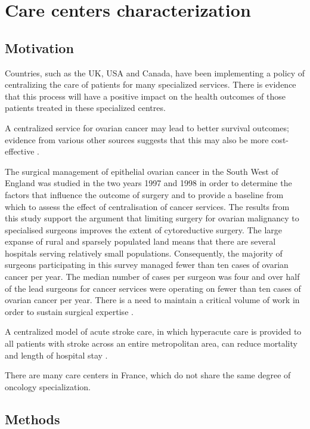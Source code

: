\chapter{Care centers characterization}

\section{Motivation}

Countries, such as the UK, USA and Canada, have been implementing a policy of
centralizing the care of patients for many specialized services. There is
evidence that this process will have a positive impact on the health outcomes of
those patients treated in these specialized centres.

A centralized service for ovarian cancer may lead to better survival outcomes;
evidence from various other sources suggests that this may also be more
cost-effective \cite{woo_centralisation_2012}.

The surgical management of epithelial ovarian cancer in the South West of
England was studied in the two years 1997 and 1998 in order to determine the
factors that influence the outcome of surgery and to provide a baseline from
which to assess the effect of centralisation of cancer services. The results
from this study support the argument that limiting surgery for ovarian
malignancy to specialised surgeons improves the extent of cytoreductive surgery.
The large expanse of rural and sparsely populated land means that there are
several hospitals serving relatively small populations. Consequently, the
majority of surgeons participating in this survey managed fewer than ten cases
of ovarian cancer per year. The median number of cases per surgeon was four and
over half of the lead surgeons for cancer services were operating on fewer than
ten cases of ovarian cancer per year. There is a need to maintain a critical
volume of work in order to sustain surgical expertise
\cite{olaitan_surgical_2001}.

A centralized model of acute stroke care, in which hyperacute care is provided
to all patients with stroke across an entire metropolitan area, can reduce
mortality and length of hospital stay \cite{morris_impact_2014}.

There are many care centers in France, which do not share the same degree of
oncology specialization.

\section{Methods}

